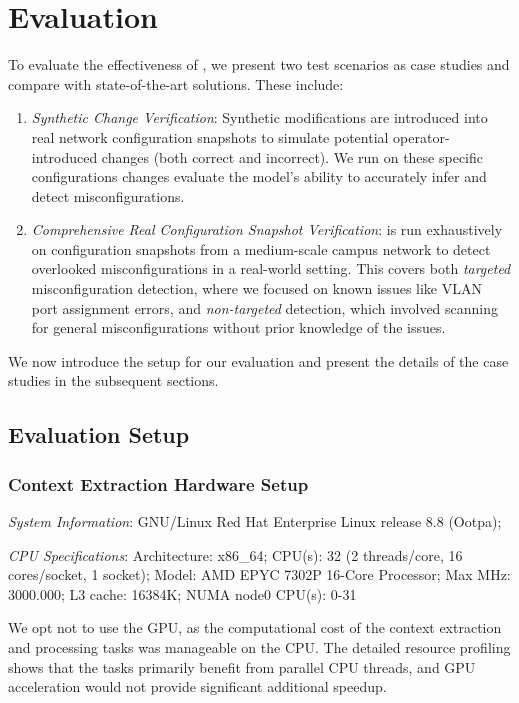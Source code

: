 \section{Evaluation}
\label{sec:eval}
To evaluate the effectiveness of \sysname{}, we present two test scenarios as case studies and compare \sysname{} with state-of-the-art solutions. These include:

\begin{enumerate}
    \item \textit{Synthetic Change Verification}: Synthetic modifications are introduced into real network configuration snapshots to simulate potential operator-introduced changes (both correct and incorrect). We run \sysname{} on these specific configurations changes evaluate the model’s ability to accurately infer and detect misconfigurations.
    \item \textit{Comprehensive Real Configuration Snapshot Verification}: \sysname{} is run exhaustively on configuration snapshots from a medium-scale campus network to detect overlooked misconfigurations in a real-world setting. This covers both \textit{targeted} misconfiguration detection, where we focused on known issues like VLAN port assignment errors, and \textit{non-targeted} detection, which involved scanning for general misconfigurations without prior knowledge of the issues.
\end{enumerate}

We now introduce the setup for our evaluation and present the details of the case studies in the subsequent sections.


\subsection{Evaluation Setup}
\subsubsection{Context Extraction Hardware Setup}


\textit{System Information}: GNU/Linux Red Hat Enterprise Linux release 8.8 (Ootpa);

\textit{CPU Specifications}: Architecture: x86\_64; CPU(s): 32 (2 threads/core, 16 cores/socket, 1 socket); Model: AMD EPYC 7302P 16-Core Processor; Max MHz: 3000.000; L3 cache: 16384K; NUMA node0 CPU(s): 0-31 

We opt not to use the GPU, as the computational cost of the context extraction and processing tasks was manageable on the CPU. The detailed resource profiling shows that the tasks primarily benefit from parallel CPU threads, and GPU acceleration would not provide significant additional speedup.


